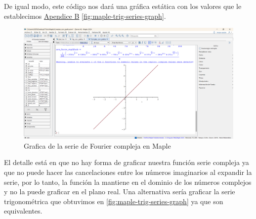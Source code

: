 De igual modo, este código nos dará una gráfica estática con los valores que le establecimos \hyperref[app2:trig-code-maple]{Apendice B} \ref{fig:maple-trig-series-graph}. 
\begin{figure}[H]
	\centering
	\includegraphics[width=1\textwidth]{img/chapter02/maple-complex-graph.png}
	\caption{Grafica de la serie de Fourier compleja en Maple}
	\label{fig:maple-complex-series-graph}  %
\end{figure}
El detalle está en que no hay forma de graficar nuestra función serie compleja ya que no puede hacer las cancelaciones entre los números imaginarios al expandir la serie, por lo tanto, la función la mantiene en el dominio de los números complejos y no la puede graficar en el plano real. Una alternativa sería graficar la serie trigonométrica que obtuvimos en \ref{fig:maple-trig-series-graph} ya que son equivalentes.


